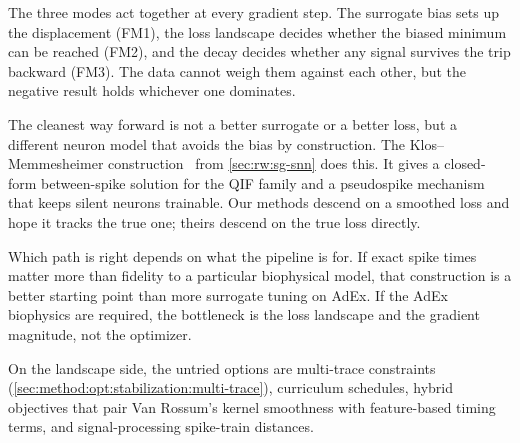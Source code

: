 The three modes act together at every gradient step.
The surrogate bias sets up the displacement (FM1), the loss landscape decides whether the biased minimum can be reached (FM2), and the decay decides whether any signal survives the trip backward (FM3).
The data cannot weigh them against each other, but the negative result holds whichever one dominates.

The cleanest way forward is not a better surrogate or a better loss, but a different neuron model that avoids the bias by construction.
The Klos--Memmesheimer construction~\cite{Klos2025} from \cref{sec:rw:sg-snn} does this.
It gives a closed-form between-spike solution for the \gls{QIF} family and a pseudospike mechanism that keeps silent neurons trainable.
Our methods descend on a smoothed loss and hope it tracks the true one; theirs descend on the true loss directly.

Which path is right depends on what the pipeline is for.
If exact spike times matter more than fidelity to a particular biophysical model, that construction is a better starting point than more surrogate tuning on \gls{AdEx}.
If the \gls{AdEx} biophysics are required, the bottleneck is the loss landscape and the gradient magnitude, not the optimizer.

On the landscape side, the untried options are multi-trace constraints (\cref{sec:method:opt:stabilization:multi-trace}), curriculum schedules, hybrid objectives that pair Van Rossum's kernel smoothness with feature-based timing terms, and signal-processing spike-train distances.

